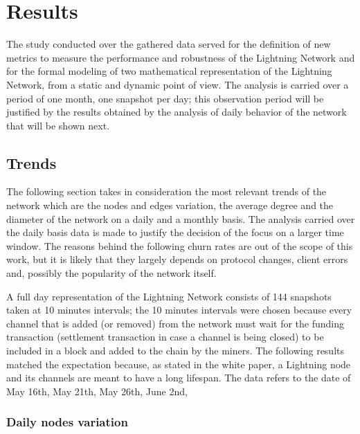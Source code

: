 
	\chapter{Results}
	
	The study conducted over the gathered data served for the definition of new metrics to measure the performance and robustness of the Lightning Network and for the formal modeling of two mathematical representation of the Lightning Network, from a static and dynamic point of view. The analysis is carried over a period of one month, one snapshot per day; this observation period will be justified by the results obtained by the analysis of daily behavior of the network that will be shown next.
	
	\section{Trends}
	
	The following section takes in consideration the most relevant trends of the network which are the nodes and edges variation, the average degree and the diameter of the network on a daily and a monthly basis. The analysis carried over the daily basis data is made to justify the decision of the focus on a larger time window. The reasons behind the following churn rates are out of the scope of this work, but it is likely that they largely depends on protocol changes, client errors and, possibly the popularity of the network itself.
	
	A full day representation of the Lightning Network consists of 144 snapshots taken at 10 minutes intervals; the 10 minutes intervals were chosen because every channel that is added (or removed) from the network must wait for the funding transaction (settlement transaction in case a channel is being closed) to be included in a block and added to the chain by the miners. The following results matched the expectation because, as stated in the white paper, a Lightning node and its channels are meant to have a long lifespan. The data refers to the date of May 16th, May 21th, May 26th, June 2nd, 
	
	\subsection{Daily nodes variation}
	
